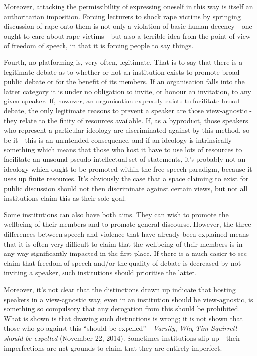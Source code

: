 \documentclass[10pt,a4paper,twoside]{article}
\begin{document}
\begin{multicols}{2}
Moreover, attacking the permissibility of expressing oneself in this way
is itself an authoritarian imposition. Forcing lecturers to shock rape
victims by springing discussion of rape onto them is not only a
violation of basic human decency - one ought to care about rape victims
- but also a terrible idea from the point of view of freedom of speech,
in that it is forcing people to say things.

Fourth, no-platforming is, very often, legitimate. That is to say that
there is a legitimate debate as to whether or not an institution exists
to promote broad public debate or for the benefit of its members. If an
organisation falls into the latter category it is under no obligation to
invite, or honour an invitation, to any given speaker. If, however, an
organisation expressly exists to facilitate broad debate, the only
legitimate reasons to prevent a speaker are those view-agnostic - they
relate to the finity of resources available. If, as a byproduct, those
speakers who represent a particular ideology are discriminated against
by this method, so be it - this is an unintended consequence, and if an
ideology is intrinsically something which means that those who host it
have to use lots of resources to facilitate an unsound
pseudo-intellectual set of statements, it's probably not an ideology
which ought to be promoted within the free speech paradigm, because it
uses up finite resources. It's obviously the case that a space claiming
to exist for public discussion should not then discriminate against
certain views, but not all institutions claim this as their sole goal.

Some institutions can also have both aims. They can wish to promote the
wellbeing of their members and to promote general discourse. However,
the three differences between speech and violence that have already been
explained means that it is often very difficult to claim that the
wellbeing of their members is in any way significantly impacted in the
first place. If there is a much easier to see claim that freedom of
speech and/or the quality of debate is decreased by not inviting a
speaker, such institutions should prioritise the latter.

Moreover, it's not clear that the distinctions drawn up indicate that
hosting speakers in a view-agnostic way, even in an institution should
be view-agnostic, is something so compulsory that any derogation from
this should be prohibited. What is shown is that drawing such
distinctions is wrong; it is not shown that those who go against this
``should be expelled'' - \emph{Varsity}, \emph{Why Tim Squirrell should
	be expelled} (November 22, 2014). Sometimes institutions slip up - their
imperfections are not grounds to claim that they are entirely imperfect.


\end{multicols}
\end{document}
